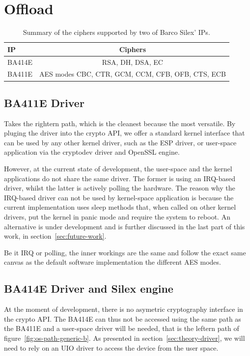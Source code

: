 \section{Offload}

\begin{table}[ht]
\begin{tabular}{|l|c|}\hline
IP & Ciphers \\ \hline
BA414E & RSA, DH, DSA, EC \\ 
BA411E & AES modes CBC, CTR, GCM, CCM, CFB, OFB, CTS, ECB \\ \hline
\end{tabular}
\caption{Summary of the ciphers supported by two of Barco Silex' IPs.}{}
\label{tab:ip-ciphers}
\end{table}

\subsection{BA411E Driver}
Takes the rightern path, which is the cleanest because the most versatile.
By pluging the driver into the crypto API, we offer a standard kernel interface that can be used by any other kernel driver, such as the ESP driver, or user-space application via the cryptodev driver and OpenSSL engine.

However, at the current state of development, the user-space and the kernel applications do not share the same driver.
The former is using an IRQ-based driver, whilst the latter is actively polling the hardware.
The reason why the IRQ-based driver can not be used by kernel-space application is because the current implementation uses sleep methods that, when called on other kernel drivers, put the kernel in panic mode and require the system to reboot.
An alternative is under development and is further discussed in the last part of this work, in section~\ref{sec:future-work}.

Be it IRQ or polling, the inner workings are the same and follow the exact same canvas as the default software implementation the different AES modes.


\subsection{BA414E Driver and Silex engine}
At the moment of development, there is no asymetric cryptography interface in the crypto API.
The BA414E can thus not be accessed using the same path as the BA411E and a user-space driver will be needed, that is the leftern path of figure~\ref{fig:os-path-generic-b}.
As presented in section~\ref{sec:theory-driver}, we will need to rely on an UIO driver to access the device from the user space.